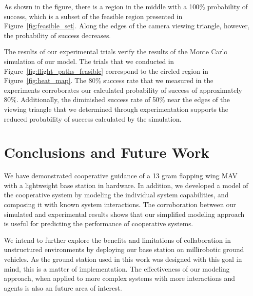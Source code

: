 \documentclass{aamas2013}
\begin{document}
As shown in the figure, there is a region in the middle with a 100\% 
probability of success, which is a subset of the feasible region presented 
in Figure~\ref{fig:feasible_set}. Along the edges of the camera viewing 
triangle, however, the probability of success decreases.

The results of our experimental trials verify the results of the Monte Carlo
simulation of our model. The trials that we conducted in
Figure~\ref{fig:flight_paths_feasible} correspond to the circled region in
Figure~\ref{fig:heat_map}. The 80\% success rate that we measured in the
experiments corroborates our calculated probability of success of
approximately 80\%. Additionally, the diminished success rate of 50\% near the
edges of the viewing triangle that we determined through experimentation
supports the reduced probability of success calculated by the simulation.

\section{Conclusions and Future Work}
We have demonstrated cooperative guidance of a 13 gram flapping wing MAV with a
lightweight base station in hardware. In addition, we developed a model of the
cooperative system by modeling the individual system capabilities, and composing
it with known system interactions. The corroboration between our simulated and
experimental results shows that our simplified modeling approach is useful for 
predicting the performance of cooperative systems.

We intend to further explore the benefits and limitations of collaboration in
unstructured environments by deploying our base station on millirobotic ground
vehicles. As the ground station used in this work was designed with this goal
in mind, this is a matter of implementation. The effectiveness of our modeling
approach, when applied to more complex systems with more interactions and 
agents is also an future area of interest. 

\end{document}
